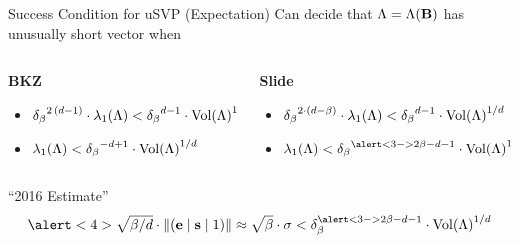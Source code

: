 \documentclass[xcolor=table,10pt,aspectratio=169]{beamer}
\begin{document}
\begin{frame}[label={sec:org7effa37}]{Success Condition for uSVP (Expectation)}
Can decide that \(\Lambda = \Lambda(\mathbf{B})\) has unusually short vector when

\vspace{1em}

\begin{columns}[t]
\begin{column}{0.45\columnwidth}
\textbf{BKZ}

\begin{itemize}
\item \({\delta_{\beta}}^{2\,(d-1)} \cdot \lambda_{1}(\Lambda) < {\delta_{\beta}}^{d-1} \cdot {\operatorname{Vol}(\Lambda)}^{1/d}\)

\item \(\lambda_{1}(\Lambda) < {\delta_{\beta}}^{-d+1} \cdot {\operatorname{Vol}(\Lambda)}^{1/d}\)
\end{itemize}
\end{column}


\begin{column}{0.45\columnwidth}
\textbf{Slide}

\begin{itemize}
\item \({\delta_{\beta}}^{2\cdot(d-\beta)} \cdot \lambda_{1}(\Lambda) < {\delta_{\beta}}^{d-1} \cdot {\operatorname{Vol}(\Lambda)}^{1/d}\)
\item \(\lambda_{1}(\Lambda) < {\delta_{\beta}}^{\alert<3->{2\beta-d-1}} \cdot {\vol(\Lambda)}^{1/d}\)
\end{itemize}

\pause
\end{column}
\end{columns}

\begin{block}{“2016 Estimate”}
\[\alert<4>{\sqrt{\beta/d}} \cdot \norm{(\vec{e} \mid \vec{s} \mid 1)} \approx \sqrt{\beta} \cdot \sigma < \delta_{\beta}^{\alert<3->{2\beta-d-1}} \cdot {\vol(\Lambda)}^{1/d}\]

\scriptsize{


}
\end{block}
\end{frame}
\end{document}
